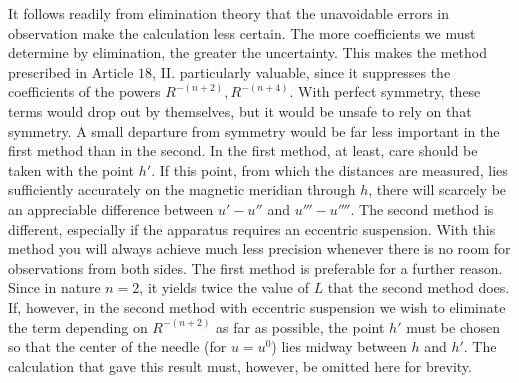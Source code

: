 It follows readily from elimination theory that the unavoidable errors in observation make the calculation less certain. The more coefficients we must determine by elimination, the greater the uncertainty. This makes the method prescribed in Article $18$, II. particularly valuable, since it suppresses the coefficients of the powers $R^{-(n+2)},R^{-(n+4)}$. With perfect symmetry, these terms would drop out by themselves, but it would be unsafe to rely on that symmetry. A small departure from symmetry would be far less important in the first method than in the second. In the first method, at least, care should be taken with the point $h'$. If this point, from which the distances are measured, lies sufficiently accurately on the magnetic meridian through $h$, there will scarcely be an appreciable difference between $u'-u''$ and $u'''-u''''$. The second method is different, especially if the apparatus requires an eccentric suspension. With this method you will always achieve much less precision whenever there is no room for observations from both sides. The first method is preferable for a further reason. Since in nature $n=2$, it yields twice the value of $L$ that the second method does. If, however, in the second method with eccentric suspension we wish to eliminate the term depending on $R^{-(n+2)}$ as far as possible, the point $h'$ must be chosen so that the center of the needle (for $u=u^0$) lies midway between $h$ and $h'$. The calculation that gave this result must, however, be omitted here for brevity.

